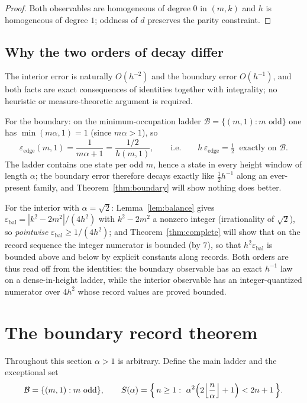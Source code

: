 \documentclass[11pt]{article}
\theoremstyle{definition}
\theoremstyle{remark}
\newcommand{\eb}{\varepsilon_{\mathrm{bal}}}
\newcommand{\ee}{\varepsilon_{\mathrm{edge}}}
\newcommand{\B}{\mathcal{B}}
\begin{document}
\begin{proof}
Both observables are homogeneous of degree $0$ in $(m,k)$ and $h$ is homogeneous of degree $1$; oddness of $d$ preserves the parity constraint.
\end{proof}

\subsection{Why the two orders of decay differ}\label{sec:orders}

The interior error is naturally $O(h^{-2})$ and the boundary error $O(h^{-1})$, and both facts are exact consequences of identities together with integrality; no heuristic or measure-theoretic argument is required.

For the boundary: on the minimum-occupation ladder $\B=\{(m,1):m \text{ odd}\}$ one has $\min(m\alpha,1)=1$ (since $m\alpha>1$), so
\begin{equation}\label{eq:half}
\ee(m,1)=\frac{1}{m\alpha+1}=\frac{1/2}{h(m,1)},
\qquad\text{i.e.}\qquad h\,\ee=\tfrac12\ \text{ exactly on }\B .
\end{equation}
The ladder contains one state per odd $m$, hence a state in every height window of length $\alpha$; the boundary error therefore decays exactly like $\tfrac12 h^{-1}$ along an ever-present family, and Theorem~\ref{thm:boundary} will show nothing does better.

For the interior with $\alpha=\sqrt2$: Lemma~\ref{lem:balance} gives $\eb=|k^2-2m^2|/(4h^2)$ with $k^2-2m^2$ a nonzero integer (irrationality of $\sqrt2$), so \emph{pointwise} $\eb\ge 1/(4h^2)$; and Theorem~\ref{thm:complete} will show that on the record sequence the integer numerator is bounded (by $7$), so that $h^2\eb$ is bounded above and below by explicit constants along records. Both orders are thus read off from the identities: the boundary observable has an exact $h^{-1}$ law on a dense-in-height ladder, while the interior observable has an integer-quantized numerator over $4h^2$ whose record values are proved bounded.

\section{The boundary record theorem}\label{sec:boundary}

Throughout this section $\alpha>1$ is arbitrary. Define the main ladder and the exceptional set
\[
\B=\{(m,1):m\ \text{odd}\},
\qquad
S(\alpha)=\Bigl\{\,n\ge1:\ \alpha^2\Bigl(2\Bigl\lfloor\frac n\alpha\Bigr\rfloor+1\Bigr)<2n+1\,\Bigr\}.
\]
\end{document}
